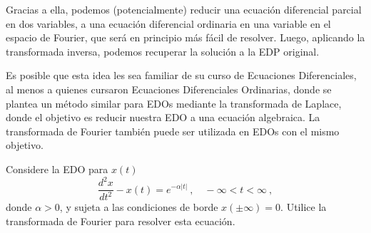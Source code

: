 Gracias a ella, podemos (potencialmente) reducir una ecuación diferencial parcial en dos variables, a una ecuación diferencial ordinaria en una variable en el espacio de Fourier, que será en principio más fácil de resolver. Luego, aplicando la transformada inversa, podemos recuperar la solución a la EDP original.

Es posible que esta idea les sea familiar de su curso de Ecuaciones Diferenciales, al menos a quienes cursaron Ecuaciones Diferenciales Ordinarias, donde se plantea un método similar para EDOs mediante la transformada de Laplace, donde el objetivo es reducir nuestra EDO a una ecuación algebraica. La transformada de Fourier también puede ser utilizada en EDOs con el mismo objetivo.

\begin{ejemplo}
    Considere la EDO para $x(t)$
    \begin{equation}
        \frac{d^2 x}{dt^2} - x(t) = e^{-\alpha |t|} \ , \quad -\infty < t < \infty \ ,
    \end{equation}
    donde $\alpha > 0$, y sujeta a las condiciones de borde $x(\pm \infty) = 0$. Utilice la transformada de Fourier para resolver esta ecuación.
    

\end{ejemplo}
